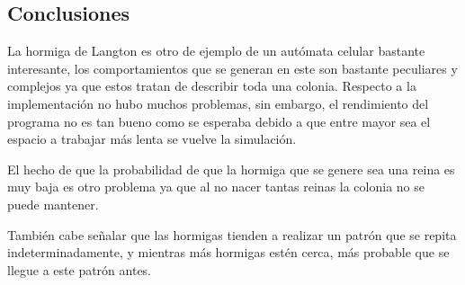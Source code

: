 \subsection{Conclusiones}

	La hormiga de Langton es otro de ejemplo de un autómata celular bastante interesante, los comportamientos que se generan en este son bastante peculiares y complejos ya que estos tratan de describir toda una colonia. Respecto a la implementación no hubo muchos problemas, sin embargo, el rendimiento del programa no es tan bueno como se esperaba debido a que entre mayor sea el espacio a trabajar más lenta se vuelve la simulación.

	El hecho de que la probabilidad de que la hormiga que se genere sea una reina es muy baja es otro problema ya que al no nacer tantas reinas la colonia no se puede mantener.

	También cabe señalar que las hormigas tienden a realizar un patrón que se repita indeterminadamente, y mientras más hormigas estén cerca, más probable que se llegue a este patrón antes.